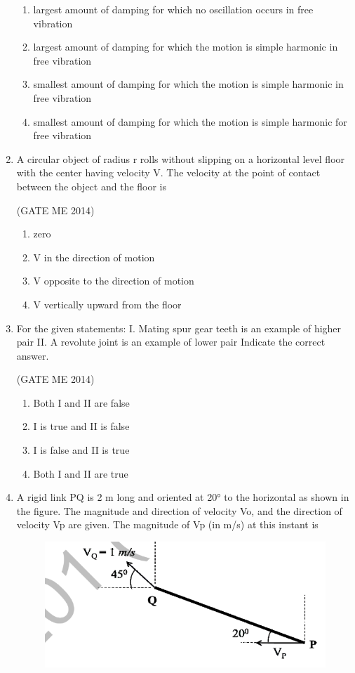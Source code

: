 \documentclass[journal]{IEEEtran}
\numberwithin{equation}{enumi}
\numberwithin{figure}{enumi}
\begin{document}
\begin{enumerate}
\begin{enumerate}
    \item largest amount of damping for which no oscillation occurs in free vibration
    \item largest amount of damping for which the motion is simple harmonic in free vibration
    \item  smallest amount of damping for which the motion is simple harmonic in free vibration
    \item smallest amount of damping for which the motion is simple harmonic for free vibration
    \end{enumerate}

\item A circular object of radius r rolls without slipping on a horizontal level floor with the center having
velocity V. The velocity at the point of contact between the object and the floor is
 
\hfill{(GATE ME 2014)}
\
    \begin{enumerate}
        \item zero
        \item V in the direction of motion
        \item  V opposite to the direction of motion
        \item V vertically upward from the floor
    \end{enumerate}

\item 
For the given statements:
I. Mating spur gear teeth is an example of higher pair
II. A revolute joint is an example of lower pair
Indicate the correct answer.

\hfill{(GATE ME 2014)}

\begin{enumerate}
    \item Both I and II are false
    \item I is true and II is false
\item  I is false and II is true
\item Both I and II are true
\end{enumerate}

\item A rigid link PQ is 2 m long and oriented at 20° to the horizontal as shown in the figure. The
magnitude and direction of velocity Vo, and the direction of velocity Vp are given. The magnitude
of Vp (in m/s) at this instant is
\begin{figure}[H]
    \centering
    \includegraphics[width = 0.6\columnwidth]{figs/fig2.2.png}
    \caption*{}
    \label{fig:Q14}
\end{figure}


\end{enumerate}
\end{document}
